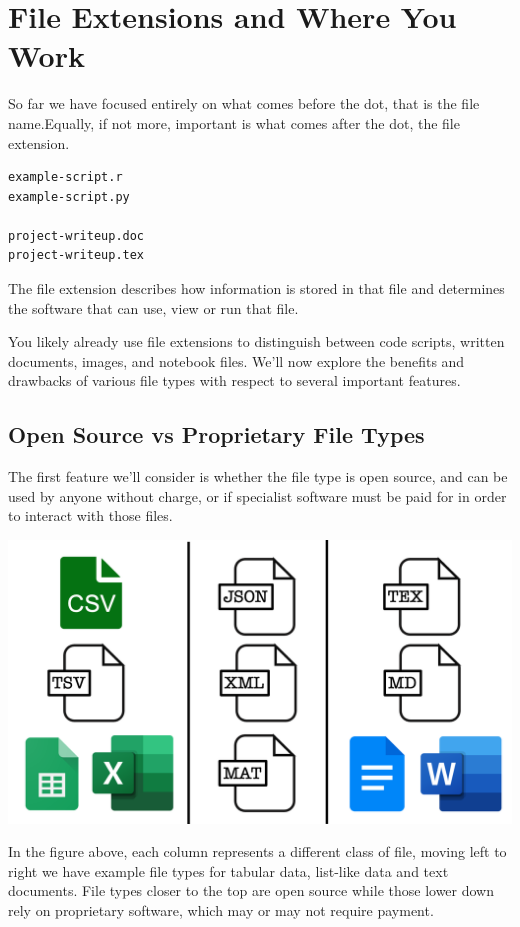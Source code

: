 \documentclass[
  12pt,
]{book}
\begin{document}
\hypertarget{file-extensions-and-where-you-work}{%
\section{File Extensions and Where You Work}\label{file-extensions-and-where-you-work}}

So far we have focused entirely on what comes before the dot, that is the file name.Equally, if not more, important is what comes after the dot, the file extension.

\begin{verbatim}
example-script.r
example-script.py

project-writeup.doc
project-writeup.tex
\end{verbatim}

The file extension describes how information is stored in that file and determines the software that can use, view or run that file.

You likely already use file extensions to distinguish between code scripts, written documents, images, and notebook files. We'll now explore the benefits and drawbacks of various file types with respect to several important features.

\hypertarget{open-source-vs-proprietary-file-types}{%
\subsection{Open Source vs Proprietary File Types}\label{open-source-vs-proprietary-file-types}}

The first feature we'll consider is whether the file type is open source, and can be used by anyone without charge, or if specialist software must be paid for in order to interact with those files.

\includegraphics[width=0.8\linewidth]{images/102-workflows-naming-files/file-types-image}

In the figure above, each column represents a different class of file, moving left to right we have example file types for tabular data, list-like data and text documents. File types closer to the top are open source while those lower down rely on proprietary software, which may or may not require payment.
\end{document}
